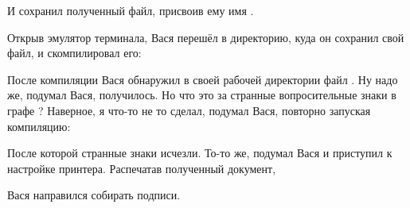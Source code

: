 И сохранил полученный файл, присвоив ему имя .

Открыв эмулятор терминала, Вася перешёл в директорию, куда он сохранил свой
файл, и скомпилировал его:


После компиляции Вася обнаружил в своей рабочей директории файл
. Ну надо же, подумал Вася, получилось. Но что это за странные
вопросительные знаки в графе ? Наверное, я что-то не то сделал,
подумал Вася, повторно запуская компиляцию:


После которой странные знаки исчезли. То-то же, подумал Вася и приступил к
настройке принтера. Распечатав полученный документ,

\begin{center}
\end{center}

Вася направился собирать подписи.
